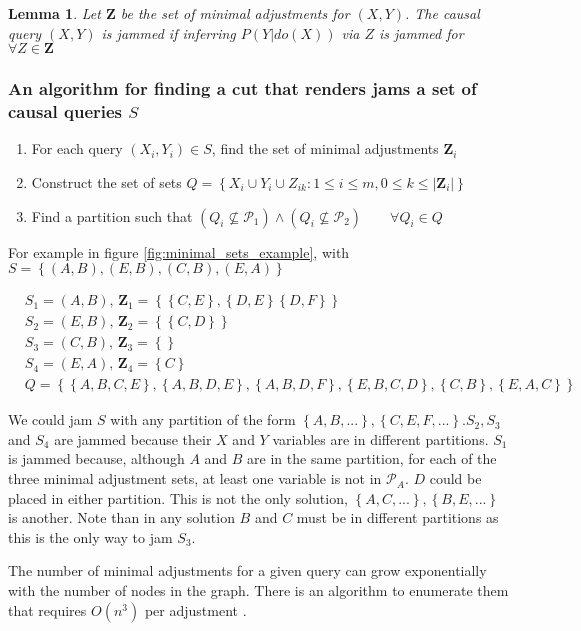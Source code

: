 \documentclass{article}
\newcommand{\set}[1]{\left\{#1\right\}}
\newcommand{\eq}[1]{\begin{align*}#1\end{align*}}
\newcommand{\pt}{\mathcal P}
\theoremstyle{plain}
\newtheorem{lemma}[theorem]{Lemma}
\theoremstyle{definition}
\begin{document}
\begin{lemma} Let $\boldsymbol{Z}$ be the set of minimal adjustments for $(X,Y)$. The causal query $(X,Y)$ is jammed if inferring $P(Y|do(X))$ via $Z$ is jammed for $\forall Z \in \boldsymbol{Z}$ 
\end{lemma}


\subsubsection{An algorithm for finding a cut that renders jams a set of causal queries $S$}
\begin{enumerate}
\item For each query $(X_i,Y_i)\in S$, find the set of minimal adjustments $\boldsymbol{Z}_i$  
\item Construct the set of sets $Q = \set{X_i \cup Y_i \cup Z_{ik} : 1 \leq i \leq m, 0 \leq k \leq |\boldsymbol{Z}_i|}$
\item Find a partition such that $(Q_i \nsubseteq \pt_1)\land (Q_i \nsubseteq \pt_2)\qquad \forall Q_i \in Q$
\end{enumerate}

For example in figure \ref{fig:minimal_sets_example}, with $S = \set{(A,B),(E,B),(C,B),(E,A)}$

\eq{
&S_1 = (A,B),\, \boldsymbol{Z}_1 = \set{\set{C, E},\set{D,E} \set{D,F}} \\
&S_2 = (E,B),\, \boldsymbol{Z}_2 = \set{\set{C,D}} \\
&S_3 = (C,B),\, \boldsymbol{Z}_3 = \set{} \\
&S_4 = (E,A),\, \boldsymbol{Z}_4 = \set{C} \\
&Q = \set{\set{A,B,C,E},\set{A,B,D,E},\set{A,B,D,F},\set{E,B,C,D},\set{C,B},\set{E,A,C}}
}


We could jam $S$ with any partition of the form $\set{A,B,...},\set{C,E,F,...}$.$S_2,S_3$ and $S_4$ are jammed because their $X$ and $Y$ variables are in different partitions. $S_1$ is jammed because, although $A$ and $B$ are in the same partition, for each of the three minimal adjustment sets, at least one variable is not in $\pt_A$. $D$ could be placed in either partition. This is not the only solution, $\set{A,C,...},\set{B,E,...}$ is another. Note than in any solution $B$ and $C$ must be in different partitions as this is the only way to jam $S_3$.

The number of minimal adjustments for a given query can grow exponentially with the number of nodes in the graph. There is an algorithm to enumerate them that requires $O(n^3)$ per adjustment \cite{textor2012adjustment} .
\end{document}
